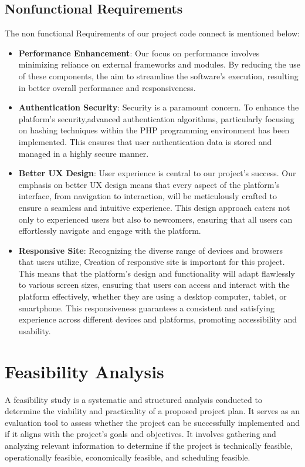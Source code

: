 \subsection{Nonfunctional Requirements}
The non functional Requirements of our project code connect is mentioned below:
\begin{itemize}
    \item \textbf{Performance Enhancement}: Our focus on performance involves minimizing reliance on external frameworks and modules. By reducing the use of these components, the aim to streamline the software's execution, resulting in better overall performance and responsiveness.
    \item \textbf{Authentication Security}: Security is a paramount concern. To enhance the platform's security,advanced authentication algorithms, particularly focusing on hashing techniques within the PHP programming environment has been implemented. This ensures that user authentication data is stored and managed in a highly secure manner.
    \item \textbf{Better UX Design}: User experience is central to our project's success. Our emphasis on better UX design means that every aspect of the platform's interface, from navigation to interaction, will be meticulously crafted to ensure a seamless and intuitive experience. This design approach caters not only to experienced users but also to newcomers, ensuring that all users can effortlessly navigate and engage with the platform.
    \item \textbf{Responsive Site}: Recognizing the diverse range of devices and browsers that users utilize, Creation of responsive site is important for this project. This means that the platform's design and functionality will adapt flawlessly to various screen sizes, ensuring that users can access and interact with the platform effectively, whether they are using a desktop computer, tablet, or smartphone. This responsiveness guarantees a consistent and satisfying experience across different devices and platforms, promoting accessibility and usability.
    
  \end{itemize}
\section{Feasibility Analysis}
A feasibility study is a systematic and structured analysis conducted to determine the viability and practicality of a proposed project plan. It serves as an evaluation tool to assess whether the project can be successfully implemented and if it aligns with the project's goals and objectives. It involves gathering and analyzing relevant information to determine if the project is technically feasible, operationally feasible, economically feasible, and scheduling feasible.
